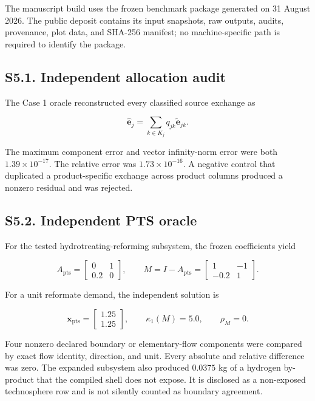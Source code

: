 \documentclass[
  10pt,
  a4paper,
  DIV=11,
  numbers=noendperiod]{scrartcl}
\begin{document}
The manuscript build uses the frozen benchmark package generated on 31
August 2026. The public deposit contains its input snapshots, raw
outputs, audits, provenance, plot data, and SHA-256 manifest; no
machine-specific path is required to identify the package.

\subsection{S5.1. Independent allocation
audit}\label{s5.1.-independent-allocation-audit}

The Case 1 oracle reconstructed every classified source exchange as

\[
\widehat{\mathbf e}_j
=
\sum_{k\in K_j}q_{jk}\widetilde{\mathbf e}_{jk}.
\]

The maximum component error and vector infinity-norm error were both
\(1.39\times10^{-17}\). The relative error was \(1.73\times10^{-16}\). A
negative control that duplicated a product-specific exchange across
product columns produced a nonzero residual and was rejected.

\subsection{S5.2. Independent PTS
oracle}\label{s5.2.-independent-pts-oracle}

For the tested hydrotreating-reforming subsystem, the frozen
coefficients yield

\[
A_{\mathrm{pts}}
=
\begin{bmatrix}
0 & 1\\
0.2 & 0
\end{bmatrix},
\qquad
M=I-A_{\mathrm{pts}}
=
\begin{bmatrix}
1 & -1\\
-0.2 & 1
\end{bmatrix}.
\]

For a unit reformate demand, the independent solution is

\[
\mathbf x_{\mathrm{pts}}
=
\begin{bmatrix}
1.25\\
1.25
\end{bmatrix},
\qquad
\kappa_1(M)=5.0,
\qquad
\rho_M=0.
\]

Four nonzero declared boundary or elementary-flow components were
compared by exact flow identity, direction, and unit. Every absolute and
relative difference was zero. The expanded subsystem also produced
\(0.0375\) kg of a hydrogen by-product that the compiled shell does not
expose. It is disclosed as a non-exposed technosphere row and is not
silently counted as boundary agreement.
\end{document}

